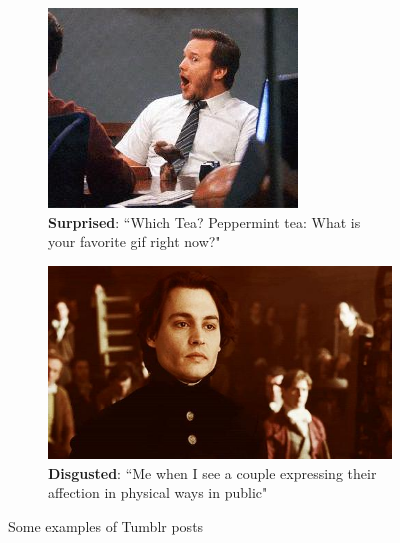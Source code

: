 \begin{figure}
\begin{subfigure}[t]{.5\textwidth}
  \includegraphics[width=.8\linewidth]{Images/surprised.jpg}
  \caption{\textbf{Surprised}: ``Which Tea? Peppermint tea: What is your favorite gif right now?"}
\end{subfigure}
\begin{subfigure}[t]{.5\textwidth}
  \vskip 0pt 
  \centering
  \includegraphics[width=.8\linewidth]{Images/disgusted.jpg}
  \caption{\textbf{Disgusted}: ``Me when I see a couple expressing their affection in physical ways in public"}
\end{subfigure}
\caption{Some examples of Tumblr posts \cite{tumblr-photos}}
\end{figure}